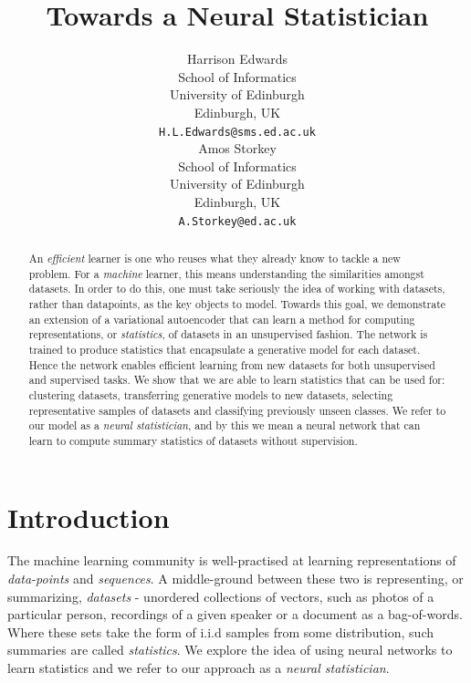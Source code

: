 \documentclass{article} %
\title{Towards a Neural Statistician}
\author{Harrison Edwards\\
  School of Informatics\\
  University of Edinburgh\\
  Edinburgh, UK \\
  \texttt{H.L.Edwards@sms.ed.ac.uk} \\
  \And Amos Storkey \\
  School of Informatics\\
  University of Edinburgh\\
  Edinburgh, UK \\
  \texttt{A.Storkey@ed.ac.uk} \\
}
\newcommand{\iid}{i.i.d }
\begin{document}
\maketitle

\begin{abstract}
An \emph{efficient} learner is one who reuses what they already know to tackle a new problem. For a \emph{machine} learner, this means understanding the similarities amongst datasets. In order to do this, one must take seriously the idea of working with datasets, rather than datapoints, as the key objects to model. Towards this goal, we demonstrate an extension of a variational autoencoder that can learn a method for computing representations, or \emph{statistics}, of datasets in an unsupervised fashion. The network is trained to produce statistics that encapsulate a generative model for each dataset. Hence the network enables efficient learning from new datasets for both unsupervised and supervised tasks. We show that we are able to learn statistics that can be used for: clustering datasets, transferring generative models to new datasets, selecting representative samples of datasets and classifying previously unseen classes. We refer to our model as a \emph{neural statistician}, and by this we mean a neural network that can learn to compute summary statistics of datasets without supervision.
\end{abstract}

\section{Introduction}

\label{introduction}
The machine learning community is well-practised at learning representations of \emph{data-points} and \emph{sequences}. A middle-ground between these two is representing, or summarizing, \emph{datasets} - unordered collections of vectors, such as photos of a particular person, recordings of a given speaker or a document as a bag-of-words. Where these sets take the form of \iid samples from some distribution, such summaries are called \emph{statistics}. We explore the idea of using neural networks to learn statistics and we refer to our approach as a \emph{neural statistician}.
\end{document}
